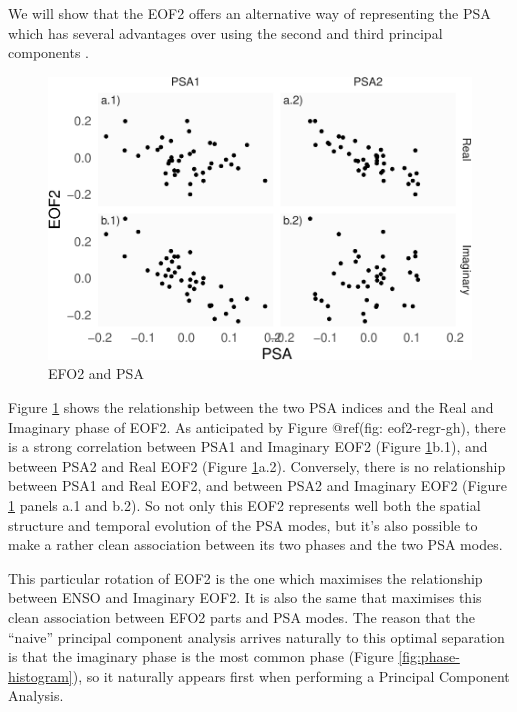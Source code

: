 \documentclass[smallextended]{svjour3}       %
\begin{document}
We will show that the EOF2 offers an alternative way of representing the PSA which has several advantages over using the second and third principal components .

\begin{figure}
\centering
\includegraphics{../figures/psa-eof2-1.pdf}
\caption{\label{fig:psa-eof2}EFO2 and PSA}
\end{figure}

Figure \ref{fig:psa-eof2} shows the relationship between the two PSA indices and the Real and Imaginary phase of EOF2. As anticipated by Figure @ref(fig: eof2-regr-gh), there is a strong correlation between PSA1 and Imaginary EOF2 (Figure \ref{fig:psa-eof2}b.1), and between PSA2 and Real EOF2 (Figure \ref{fig:psa-eof2}a.2). Conversely, there is no relationship between PSA1 and Real EOF2, and between PSA2 and Imaginary EOF2 (Figure \ref{fig:psa-eof2} panels a.1 and b.2). So not only this EOF2 represents well both the spatial structure and temporal evolution of the PSA modes, but it's also possible to make a rather clean association between its two phases and the two PSA modes.

This particular rotation of EOF2 is the one which maximises the relationship between ENSO and Imaginary EOF2. It is also the same that maximises this clean association between EFO2 parts and PSA modes. The reason that the ``naive'' principal component analysis arrives naturally to this optimal separation is that the imaginary phase is the most common phase (Figure \ref{fig:phase-histogram}), so it naturally appears first when performing a Principal Component Analysis.
\end{document}
